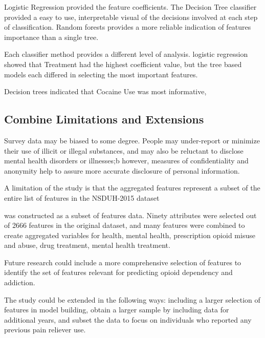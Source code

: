 \documentclass[sigconf]{acmart}
\begin{document}
Logistic Regression provided the feature coefficients. 
The Decision Tree classifier provided a easy to use, interpretable visual of
the decisions involved at each step of classification. Random forests provides
a more reliable indication of features importance than a single tree. 

Each classifier method provides a different level of analysis. 
logistic regression showed that Treatment had the highest coefficient value, but 
the tree based models each differed in selecting the most important features. 

Decision trees indicated that Cocaine Use was most informative,



\subsection{Combine Limitations and Extensions}

Survey data may be biased to some degree. People may under-report or minimize 
their use of illicit or illegal substances, and may also be reluctant to 
disclose mental health disorders or illnesses;b however, measures of 
confidentiality and anonymity help to assure more accurate disclosure 
of personal information. 

A limitation of the study is that the aggregated features represent a subset
of the entire list of features in the NSDUH-2015 dataset 


was constructed as a subset of 
features data. 
Ninety attributes were selected out of 2666 features in the original dataset, 
and many features were combined to create aggregated variables for health, 
mental health, prescription opioid misuse and abuse, drug treatment, mental health
treatment. 

Future research could include a more comprehensive selection of
features to identify the set of features relevant for predicting opioid
dependency and addiction. 



The study could be extended in the following ways: including a larger
selection of features in model building, obtain a larger sample by including 
data for additional years, and subset the data to focus on individuals who 
reported any previous pain reliever use. 


\end{document}
